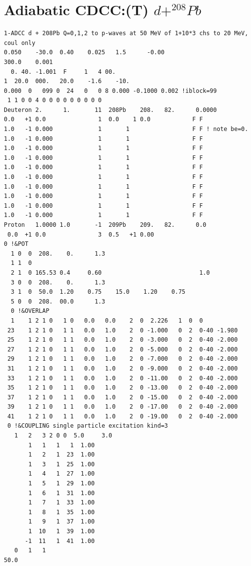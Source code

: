 \documentclass[11pt]{book}
\begin{document}
\section{Adiabatic CDCC:(T) $d+^{208}Pb$}
\begin{small} 
\begin{lstlisting}[frame=single]
1-ADCC d + 208Pb Q=0,1,2 to p-waves at 50 MeV of 1+10*3 chs to 20 MeV, coul only
0.050    -30.0  0.40    0.025   1.5      -0.00
300.0    0.001
  0. 40. -1.001  F     1   4 00. 
1  20.0  000.   20.0    -1.6    -10.
0.000  0   099 0  24   0   0 8 0.000 -0.1000 0.002 !iblock=99
 1 1 0 0 4 0 0 0 0 0 0 0 0 0
Deuteron 2.      1.       11  208Pb    208.   82.      0.0000
0.0   +1 0.0               1  0.0    1 0.0            F F
1.0   -1 0.000             1       1                  F F ! note be=0.
1.0   -1 0.000             1       1                  F F
1.0   -1 0.000             1       1                  F F
1.0   -1 0.000             1       1                  F F
1.0   -1 0.000             1       1                  F F
1.0   -1 0.000             1       1                  F F
1.0   -1 0.000             1       1                  F F
1.0   -1 0.000             1       1                  F F
1.0   -1 0.000             1       1                  F F
1.0   -1 0.000             1       1                  F F
Proton   1.0000 1.0       -1  209Pb    209.   82.      0.0
 0.0  +1 0.0               3  0.5   +1 0.00
0 !&POT
  1 0  0  208.    0.      1.3 
  1 1  0
  2 1  0 165.53 0.4     0.60                            1.0
  3 0  0  208.    0.      1.3
  3 1  0  50.0  1.20    0.75    15.0    1.20    0.75
  5 0  0  208.  00.0      1.3
  0 !&OVERLAP
  1    1 2 1 0   1 0   0.0   0.0    2  0  2.226   1  0  0
 23    1 2 1 0   1 1   0.0   1.0    2  0 -1.000   0  2  0-40 -1.980
 25    1 2 1 0   1 1   0.0   1.0    2  0 -3.000   0  2  0-40 -2.000
 27    1 2 1 0   1 1   0.0   1.0    2  0 -5.000   0  2  0-40 -2.000
 29    1 2 1 0   1 1   0.0   1.0    2  0 -7.000   0  2  0-40 -2.000
 31    1 2 1 0   1 1   0.0   1.0    2  0 -9.000   0  2  0-40 -2.000
 33    1 2 1 0   1 1   0.0   1.0    2  0 -11.00   0  2  0-40 -2.000
 35    1 2 1 0   1 1   0.0   1.0    2  0 -13.00   0  2  0-40 -2.000
 37    1 2 1 0   1 1   0.0   1.0    2  0 -15.00   0  2  0-40 -2.000
 39    1 2 1 0   1 1   0.0   1.0    2  0 -17.00   0  2  0-40 -2.000
 41    1 2 1 0   1 1   0.0   1.0    2  0 -19.00   0  2  0-40 -2.000
 0 !&COUPLING single particle excitation kind=3
   1   2   3 2 0 0  5.0     3.0
       1   1   1   1  1.00
       1   2   1  23  1.00
       1   3   1  25  1.00
       1   4   1  27  1.00
       1   5   1  29  1.00
       1   6   1  31  1.00
       1   7   1  33  1.00
       1   8   1  35  1.00
       1   9   1  37  1.00
       1  10   1  39  1.00
      -1  11   1  41  1.00
   0   1   1
50.0
\end{lstlisting}
\end{small} 
\end{document}

